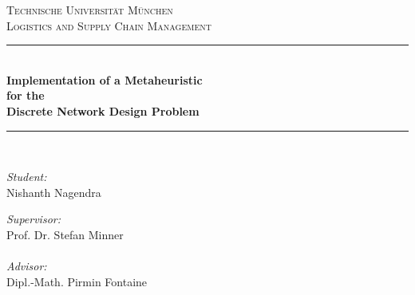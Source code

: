 \documentclass[a4paper, 12pt]{article}
\begin{document}
\begin{titlepage}

\newcommand{\HRule}{\rule{135mm}{0.5mm}} %

\center %


\textsc{\LARGE Technische Universit{\"a}t M{\"u}nchen}\\[1.5cm] %
\textsc{\Large Logistics and Supply Chain Management}\\[0.5cm] %


\HRule \\[0.4cm]
{ \Large \bfseries Implementation of a Metaheuristic\\for the\\Discrete Network Design Problem}\\[0.5cm] %
\HRule \\[1.5cm]


\begin{minipage}{0.4\textwidth}
\begin{flushleft} \large
\emph{Student:}\\
Nishanth Nagendra %
\end{flushleft}
\end{minipage}
\begin{minipage}{0.4\textwidth} 
\begin{flushright} \large
\emph{Supervisor:} \\
Prof. Dr. Stefan Minner \\~\\ %
\emph{Advisor:} \\
Dipl.-Math. Pirmin Fontaine %
\end{flushright}
\end{minipage}\\[2cm]


\end{titlepage}
\end{document}
